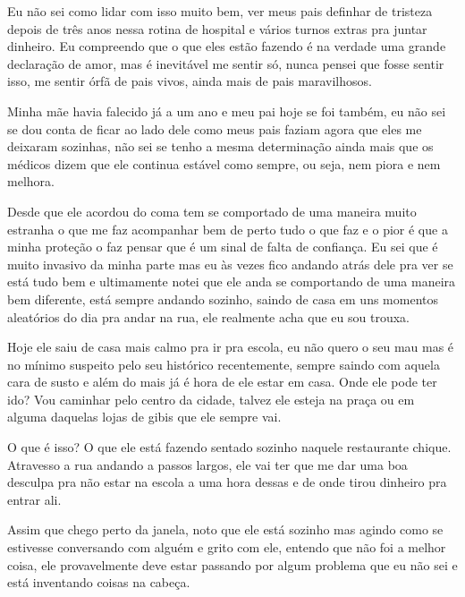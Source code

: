 Eu não sei como lidar com isso muito bem, ver meus pais definhar de tristeza depois de três anos nessa rotina de hospital e vários turnos extras pra juntar dinheiro. Eu compreendo que o que eles estão fazendo é na verdade uma grande declaração de amor, mas é inevitável me sentir só, nunca pensei que fosse sentir isso, me sentir órfã de pais vivos, ainda mais de pais maravilhosos.


Minha mãe havia falecido já a um ano e meu pai hoje se foi também, eu não sei se dou conta de ficar ao lado dele como meus pais faziam agora que eles me deixaram sozinhas, não sei se tenho a mesma determinação ainda mais que os médicos dizem que ele continua estável como sempre, ou seja, nem piora e nem melhora.


Desde que ele acordou do coma tem se comportado de uma maneira muito estranha o que me faz acompanhar bem de perto tudo o que faz e o pior é que a minha proteção o faz pensar que é um sinal de falta de confiança. Eu sei que é muito invasivo da minha parte mas eu às vezes fico andando atrás dele pra ver se está tudo bem e ultimamente notei que ele anda se comportando de uma maneira bem diferente, está sempre andando sozinho, saindo de casa em uns momentos aleatórios do dia pra andar na rua, ele realmente acha que eu sou trouxa.


Hoje ele saiu de casa mais calmo pra ir pra escola, eu não quero o seu mau mas é no mínimo suspeito pelo seu histórico recentemente, sempre saindo com aquela cara de susto e além do mais já é hora de ele estar em casa.
Onde ele pode ter ido? Vou caminhar pelo centro da cidade, talvez ele esteja na praça ou em alguma daquelas lojas de gibis que ele sempre vai.


O que é isso? O que ele está fazendo sentado sozinho naquele restaurante chique. Atravesso a rua andando a passos largos, ele vai ter que me dar uma boa desculpa pra não estar na escola a uma hora dessas e de onde tirou dinheiro pra entrar ali.

Assim que chego perto da janela, noto que ele está sozinho mas agindo como se estivesse conversando com alguém e grito com ele, entendo que não foi a melhor coisa, ele provavelmente deve estar passando por algum problema que eu não sei e está inventando coisas na cabeça.

